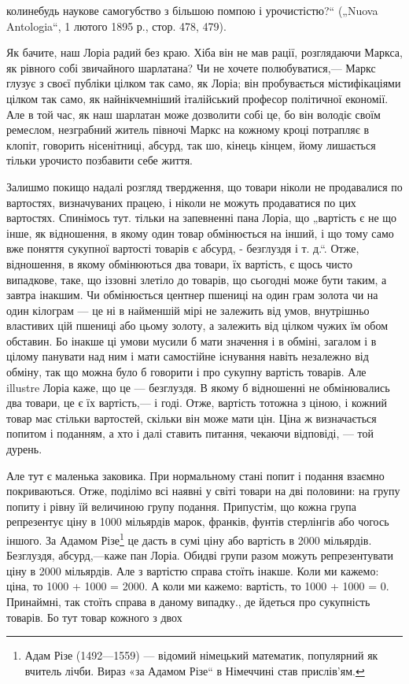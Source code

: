 \parcont{}  %
колинебудь наукове самогубство з більшою помпою і урочистістю?“  („Nuova Antologia“, 1 лютого
1895 р., стор. 478, 479).

Як бачите, наш Лоріа радий без краю. Хіба він не мав рації, розглядаючи
Маркса, як рівного собі звичайного шарлатана?  Чи не хочете полюбуватися,— Маркс глузує з своєї
публіки цілком так само, як Лоріа; він пробувається містифікаціями цілком так само, як
найнікчемніший італійський професор політичної економії. Але в той час, як наш шарлатан може
дозволити собі це, бо він володіє своїм ремеслом, незграбний житель півночі Маркс на кожному
кроці потрапляє в клопіт, говорить нісенітниці, абсурд, так шо, кінець кінцем, йому лишається
тільки урочисто позбавити себе життя.

Залишмо покищо надалі розгляд твердження, що товари ніколи
не продавалися по вартостях, визначуваних працею, і ніколи не можуть продаватися по цих
вартостях. Спинімось тут. тільки на запевненні пана Лоріа, що „вартість є не що інше, як
відношення, в якому один товар обмінюється на інший, і що тому само вже поняття сукупної вартості
товарів є абсурд, - безглуздя і т. д.“. Отже, відношення, в якому обмінюються два товари, їх
вартість, є щось чисто випадкове, таке, що іззовні злетіло до товарів, що сьогодні може бути
таким, а завтра інакшим. Чи обмінюється центнер пшениці на один грам золота чи на один кілограм —
це ні в найменшій мірі не залежить від умов, внутрішньо властивих цій пшениці або цьому золоту,
а залежить від цілком чужих їм обом обставин. Бо інакше ці умови мусили б мати значення і в
обміні, загалом і в цілому панувати над ним і мати самостійне існування навіть незалежно від
обміну, так що можна було б говорити і про сукупну вартість товарів. Але illustre Лоріа каже, що
це — безглуздя. В якому б відношенні не обмінювались два товари, це є їх вартість,— і годі.
Отже, вартість тотожна з ціною, і кожний товар має стільки вартостей, скільки він може мати цін.
Ціна ж визначається попитом і поданням, а хто і далі ставить питання, чекаючи відповіді, — той
дурень.

Але тут є маленька заковика. При нормальному стані попит і подання взаємно покриваються.
Отже, поділімо всі наявні у світі товари на дві половини: на групу попиту і рівну їй величиною
групу подання. Припустім, що кожна група репрезентує ціну в 1000 мільярдів марок, франків,
фунтів стерлінгів або чогось іншого. За Адамом Різе\footnote*{Адам Різе (1492—1559) — відомий німецький математик, популярний як вчитель лічби. Вираз «за Адамом Різе“ в Німеччині став прислів’ям. } це дасть в сумі ціну або вартість в 2000
мільярдів. Безглуздя, абсурд,—каже пан Лоріа. Обидві групи разом можуть репрезентувати ціну в
2000 мільярдів. Але з вартістю справа стоїть інакше. Коли ми кажемо:  ціна, то 1000 + 1000 =
2000. А коли ми кажемо: вартість, то 1000 + 1000 = 0. Принаймні, так стоїть справа в даному
випадку., де йдеться про сукупність товарів. Бо тут товар кожного з двох
\parbreak{}
